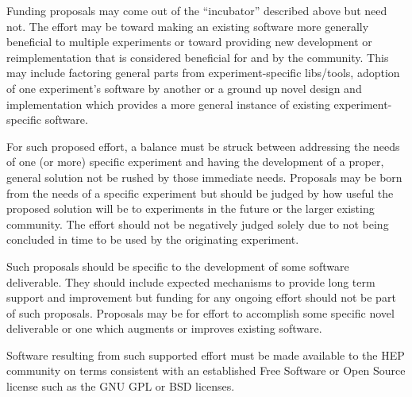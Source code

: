 Funding proposals may come out of the ``incubator'' described above but need not.
The effort may be toward making an existing software more generally
beneficial to multiple experiments
or toward providing new development or reimplementation that is 
considered beneficial for and by the community.  This may include factoring
general parts from experiment-specific libs/tools, adoption of one
experiment's software by another or a ground up novel design and
implementation which provides a more general instance of existing
experiment-specific software.

For such proposed effort, a balance must be struck between addressing
the needs of one (or more) specific experiment and having the
development of a proper, general solution not be rushed by those
immediate needs.  Proposals may be born from the needs of a specific
experiment but should be judged by how useful the proposed solution
will be to experiments in the future or the larger existing community.
The effort should not be negatively judged solely due to not being
concluded in time to be used by the originating experiment.

Such proposals should be specific to the development of some software
deliverable.  They should include expected mechanisms to provide long
term support and improvement but funding for any ongoing effort should
not be part of such proposals.  Proposals may be for effort to
accomplish some specific novel deliverable or one which augments or
improves existing software.

Software resulting from such supported effort must be made available
to the HEP community on terms consistent with an  established
Free Software or Open Source license such as the GNU GPL or BSD licenses.

